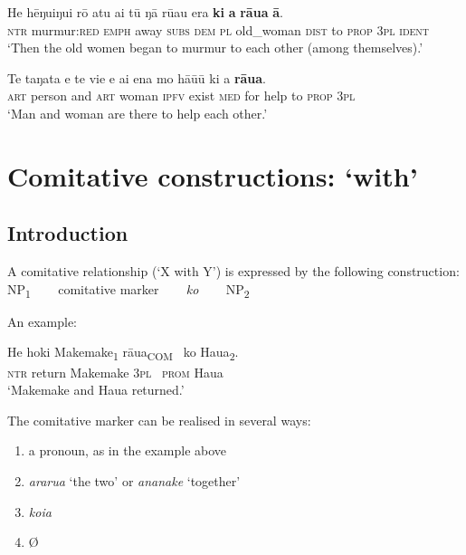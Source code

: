 \ea\label{ex:8.189}
\gll He hēŋu{\ꞌ}iŋu{\ꞌ}i rō atu {\ꞌ}ai tū ŋā rū{\ꞌ}au era \textbf{ki} \textbf{a} \textbf{rāua} \textbf{{\ꞌ}ā}. \\
\textsc{ntr} murmur:\textsc{red} \textsc{emph} away \textsc{subs} \textsc{dem} \textsc{pl} old\_woman \textsc{dist} to \textsc{prop} \textsc{3pl} \textsc{ident} \\

\glt 
‘Then the old women began to murmur to each other (among themselves).’ \textstyleExampleref{[R347.045]} 
\z

\ea\label{ex:8.190}
\gll Te taŋata {\ꞌ}e te vi{\ꞌ}e e ai ena mo hā{\ꞌ}ū{\ꞌ}ū ki a \textbf{rāua}. \\
\textsc{art} person and \textsc{art} woman \textsc{ipfv} exist \textsc{med} for help to \textsc{prop} \textsc{3pl} \\

\glt 
‘Man and woman are there to help each other.’ \textstyleExampleref{[1 Cor. 11:11]}
\z
{}

\largerpage
\section{Comitative constructions: ‘with’}\label{sec:8.10}
\subsection{Introduction}\label{sec:8.10.1}

A comitative relationship (‘X with Y’) is expressed by the following construction:
\ea\label{ex:8.190a}
  NP\textsubscript{1}  ~~~  comitative marker   ~~~ \textit{ko} ~~~   NP\textsubscript{2}
\z

An example:

\ea\label{ex:8.191}
\gll He hoki Makemake\textsubscript{\textup{1}} rāua\textsubscript{\textup{COM}} ~ko Haua\textsubscript{\textup{2}}.\\
\textsc{ntr} return Makemake \textsc{3pl} ~\textsc{prom} Haua\\

\glt
‘Makemake and Haua returned.’ \textstyleExampleref{[Mtx-1-01.029]}
\z

The comitative marker can be realised in several ways:

\begin{enumerate}
\item 
a pronoun, as in the example above

\item 
\textit{ararua} ‘the two’ or \textit{ananake} ‘together’ 

\item 
\textit{koia}

\item 
Ø

\end{enumerate}


